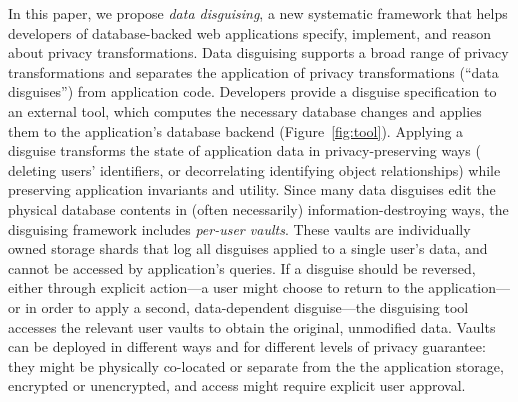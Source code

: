 %
%
%
%
%

%
%

%
In this paper, we propose \emph{data disguising}, a new systematic framework that helps developers
of database-backed web applications specify, implement, and reason about privacy transformations.
%
Data disguising supports a broad range of privacy transformations and separates the application
of privacy transformations (``data disguises'') from application code.
%
Developers provide a disguise specification to an external tool, which computes the necessary
database changes and applies them to the application's database backend (Figure~\ref{fig:tool}).
%
Applying a disguise transforms the state of application data in privacy-preserving ways (\eg
deleting users' identifiers, or decorrelating identifying object relationships) while preserving
application invariants and utility.
%
Since many data disguises edit the physical database contents in (often necessarily)
information-destroying ways, the disguising framework includes \emph{per-user vaults}.
These vaults are individually owned storage shards that log all disguises applied to a single user's data,
and cannot be accessed by application's queries.
%
If a disguise should be reversed, either through explicit action---\eg a user might choose to return
to the application---or in order to apply a second, data-dependent
disguise---the disguising tool accesses the relevant user vaults to obtain the original,
unmodified data.
%
Vaults can be deployed in different ways and for different levels of privacy guarantee: they
might be physically co-located or separate from the the application storage, encrypted or
unencrypted, and access might require explicit user approval.
%

